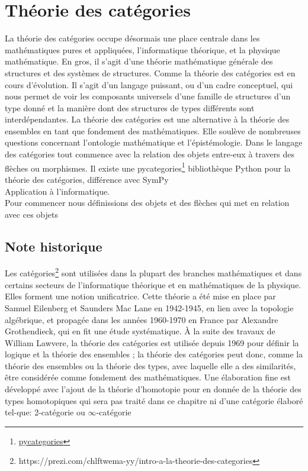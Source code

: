 \chapter{Théorie des catégories}
La théorie des catégories occupe désormais une place centrale dans les mathématiques pures et appliquées,  
l'informatique théorique, et la physique mathématique. En gros, il s’agit d’une 
théorie mathématique générale des structures et des systèmes de structures. Comme la théorie des catégories 
est en cours d'évolution. Il s'agit d'un langage puissant, ou d’un cadre conceptuel, qui nous permet de voir les composants universels d’une famille de structures d’un type donné et la manière dont des structures de types différents sont interdépendantes.  La théorie des catégories est une alternative à la théorie des ensembles en tant que fondement des mathématiques. Elle soulève de nombreuses questions concernant l'ontologie mathématique et l'épistémologie. Dans le langage des catégories tout commence avec la relation des objets entre-eux à travers des flèches ou morphismes. Il existe une pycategories\footnote{\href{https://pypi.org/project/pycategories/}{pycategories}} bibliothèque Python pour la théorie des catégories, différence avec SymPy
\\

Application à l'informatique.
\\

Pour commencer nous définissions des objets et des flèches qui met en relation avec ces objets 
\section{Note historique}
Les catégories\footnote{https://prezi.com/chlftwema-yy/intro-a-la-theorie-des-categories} sont utilisées dans la plupart des branches mathématiques et dans certains secteurs de l'informatique théorique et en mathématiques de la physique. Elles forment une notion unificatrice. Cette théorie a été mise en place par Samuel Eilenberg et Saunders Mac Lane en 1942-1945, en lien avec la topologie algébrique, et propagée dans les années 1960-1970 en France par Alexandre Grothendieck, qui en fit une étude systématique. À la suite des travaux de William Lawvere, la théorie des catégories est utilisée depuis 1969 pour définir la logique et la théorie des ensembles ; la théorie des catégories peut donc, comme la théorie des ensembles ou la théorie des types, avec laquelle elle a des similarités, être considérée comme fondement des mathématiques. Une élaboration fine est développé avec l'ajout de la théorie d'homotopie pour en donnée de la théorie des types homotopiques qui sera pas traité dans ce chapitre  ni d'une catégorie élaboré tel-que: 2-catégorie ou $\infty$-catégorie
